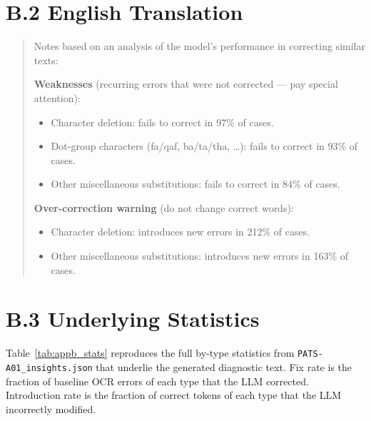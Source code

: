 \section*{B.2 \quad English Translation}

\begin{quote}
  Notes based on an analysis of the model's performance in correcting similar
  texts:

  \bigskip
  \textbf{Weaknesses} (recurring errors that were not corrected --- pay
  special attention):

  \begin{itemize}
    \item Character deletion: fails to correct in 97\% of cases.
    \item Dot-group characters (fa/qaf, ba/ta/tha, \ldots): fails to correct
          in 93\% of cases.
    \item Other miscellaneous substitutions: fails to correct in 84\% of cases.
  \end{itemize}

  \textbf{Over-correction warning} (do not change correct words):

  \begin{itemize}
    \item Character deletion: introduces new errors in 212\% of cases.
    \item Other miscellaneous substitutions: introduces new errors in 163\% of
          cases.
  \end{itemize}
\end{quote}

\section*{B.3 \quad Underlying Statistics}

Table~\ref{tab:appb_stats} reproduces the full by-type statistics from
\texttt{PATS-A01\_insights.json} that underlie the generated diagnostic text.
Fix rate is the fraction of baseline OCR errors of each type that the LLM
corrected. Introduction rate is the fraction of correct tokens of each type
that the LLM incorrectly modified.

